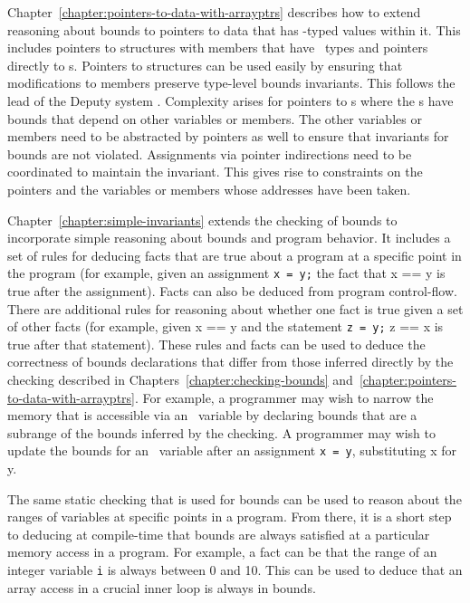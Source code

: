 Chapter~\ref{chapter:pointers-to-data-with-arrayptrs} describes how
to extend reasoning about bounds to pointers to data that has \arrayptr-typed
values within it.  This includes pointers to structures with members that
have \arrayptr\ types and pointers directly to \arrayptr s.  Pointers to 
structures can be used easily by ensuring that modifications to members
preserve type-level bounds invariants. 
This follows the lead of the Deputy system \cite{Condit2007}. 
Complexity arises for pointers to \arrayptr s where 
the \arrayptr s have bounds that depend on other variables or members.  The 
other variables or members need to be abstracted by pointers as well to ensure 
that invariants for bounds are not violated.  Assignments via pointer
indirections need to be coordinated to maintain the invariant.  This
gives rise to constraints on the pointers and the variables or
members whose addresses have been taken.

Chapter~\ref{chapter:simple-invariants}
extends the checking of bounds to incorporate simple
reasoning about bounds and program behavior. It includes a set of rules
for deducing facts that are true about a program at a specific point in
the program (for example, given an assignment \texttt{x = y;} the fact
that x == y is true after the assignment). Facts can also be deduced
from program control-flow. There are additional rules for reasoning
about whether one fact is true given a set of other facts (for example,
given x == y and the statement \texttt{z = y;} z == x is true after that
statement). These rules and facts can be used to deduce the correctness
of bounds declarations that differ from those inferred directly by the
checking described in Chapters~\ref{chapter:checking-bounds} 
and~\ref{chapter:pointers-to-data-with-arrayptrs}. For example, 
a programmer may wish to narrow the memory that is accessible via an
\arrayptr\ variable by declaring bounds that are a subrange of
the bounds inferred by the checking. A programmer may wish to update the
bounds for an \arrayptr\ variable after an assignment \texttt{x
= y}, substituting x for y.

The same static checking that is used for bounds can be used to reason
about the ranges of variables at specific points in a program. From
there, it is a short step to deducing at compile-time that bounds are
always satisfied at a particular memory access in a program. For
example, a fact can be that the range of an integer variable \texttt{i}
is always between 0 and 10. This can be used to deduce that an array
access in a crucial inner loop is always in bounds.

